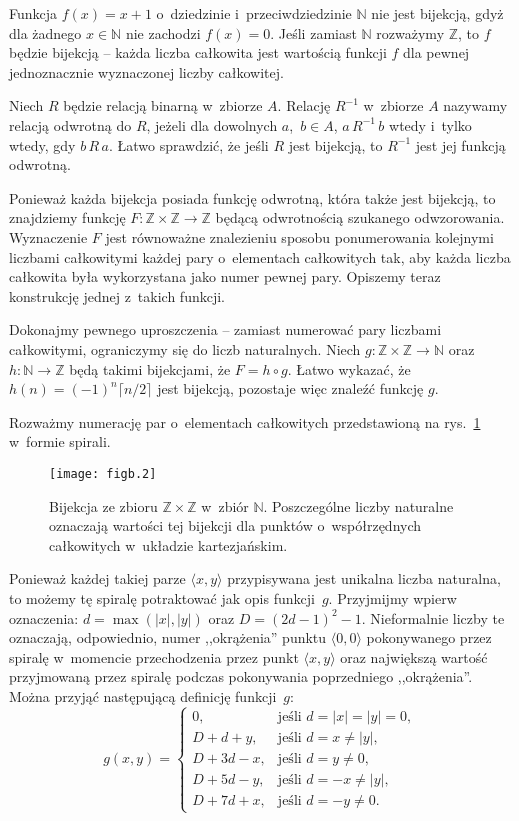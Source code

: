 \exercise %
Funkcja $f(x)=x+1$ o~dziedzinie i~przeciwdziedzinie $\mathbb{N}$ nie jest bijekcją, gdyż dla żadnego $x\in\mathbb{N}$ nie zachodzi $f(x)=0$. Jeśli zamiast $\mathbb{N}$ rozważymy $\mathbb{Z}$, to $f$ będzie bijekcją -- każda liczba całkowita jest wartością funkcji $f$ dla pewnej jednoznacznie wyznaczonej liczby całkowitej.

\exercise %
Niech $R$ będzie relacją binarną w~zbiorze $A$. Relację $R^{-1}$ w~zbiorze $A$ nazywamy relacją odwrotną do $R$, jeżeli dla dowolnych $a$,~$b\in A$, $a\,R^{-1}\,b$ wtedy i~tylko wtedy, gdy $b\,R\,a$. Łatwo sprawdzić, że jeśli $R$ jest bijekcją, to $R^{-1}$ jest jej funkcją odwrotną.

\exercise %
Ponieważ każda bijekcja posiada funkcję odwrotną, która także jest bijekcją, to znajdziemy funkcję $F\colon\mathbb{Z}\times\mathbb{Z}\to\mathbb{Z}$ będącą odwrotnością szukanego odwzorowania. Wyznaczenie $F$ jest równoważne znalezieniu sposobu ponumerowania kolejnymi liczbami całkowitymi każdej pary o~elementach całkowitych tak, aby każda liczba całkowita była wykorzystana jako numer pewnej pary. Opiszemy teraz konstrukcję jednej z~takich funkcji.

Dokonajmy pewnego uproszczenia -- zamiast numerować pary liczbami całkowitymi, ograniczymy się do liczb naturalnych. Niech $g\colon\mathbb{Z}\times\mathbb{Z}\to\mathbb{N}$ oraz $h\colon\mathbb{N}\to\mathbb{Z}$ będą takimi bijekcjami, że $F=h\circ g$. Łatwo wykazać, że $h(n)=(-1)^n\lceil n/2\rceil$ jest bijekcją, pozostaje więc znaleźć funkcję $g$.

Rozważmy numerację par o~elementach całkowitych przedstawioną na rys.~\ref{fig:B.3-4} w~formie spirali.
\begin{figure}[ht]
	\begin{center}
		\texttt{[image: figb.2]}
	\end{center}
	\caption{Bijekcja ze zbioru $\mathbb{Z}\times\mathbb{Z}$ w~zbiór $\mathbb{N}$. Poszczególne liczby naturalne oznaczają wartości tej bijekcji dla punktów o~współrzędnych całkowitych w~układzie kartezjańskim.} \label{fig:B.3-4}
\end{figure}
Ponieważ każdej takiej parze $\langle x,y\rangle$ przypisywana jest unikalna liczba naturalna, to możemy tę spiralę potraktować jak opis funkcji~$g$. Przyjmijmy wpierw oznaczenia: $d=\max(|x|,|y|)$ oraz $D=(2d-1)^2-1$. Nieformalnie liczby te oznaczają, odpowiednio, numer ,,okrążenia'' punktu $\langle0,0\rangle$ pokonywanego przez spiralę w~momencie przechodzenia przez punkt $\langle x,y\rangle$ oraz największą wartość przyjmowaną przez spiralę podczas pokonywania poprzedniego ,,okrążenia''. Można przyjąć następującą definicję funkcji~$g$:
\[
	g(x,y) =
	\begin{cases}
		0, & \text{jeśli $d=|x|=|y|=0$}, \\
		D+d+y, & \text{jeśli $d=x\ne|y|$}, \\
		D+3d-x, & \text{jeśli $d=y\ne0$}, \\
		D+5d-y, & \text{jeśli $d=-x\ne|y|$}, \\
		D+7d+x, & \text{jeśli $d=-y\ne0$}.
	\end{cases}
\]

